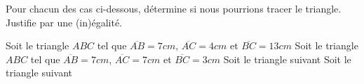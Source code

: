%
%
Pour chacun des cas ci-dessous, détermine si nous pourrions tracer le triangle. \\
  Justifie par une (in)égalité.
  \begin{tasks}
    \task Soit le triangle $ABC$ tel que $\overline{AB} =7cm$, $\overline{AC} = 4cm$ et $\overline{BC} = 13cm$
    \task Soit le triangle $ABC$ tel que $\overline{AB} =7cm$, $\overline{AC} = 7cm$ et $\overline{BC} = 3cm$
    \task Soit le triangle suivant %
    \task Soit le triangle suivant %
  \end{tasks}
